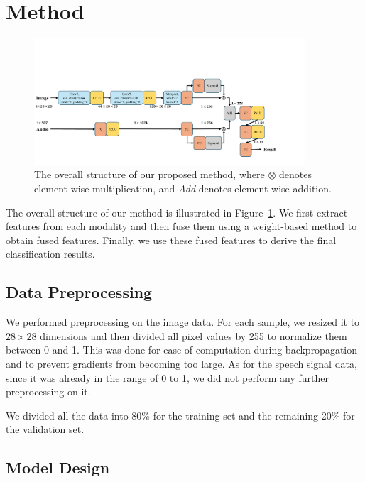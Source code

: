 \documentclass{article}
\begin{document}
\section{Method}

\begin{figure}[!t]
	\begin{center}

		\includegraphics[width=0.90\textwidth]{overview.pdf}
	\end{center}
	\caption{The overall structure of our proposed method, where $\otimes$ denotes element-wise multiplication, and \textit{Add} denotes element-wise addition.} 
	\label{fig:overview}
\end{figure}

The overall structure of our method is illustrated in Figure~\ref{fig:overview}. We first extract features from each modality and then fuse them using a weight-based method to obtain fused features. Finally, we use these fused features to derive the final classification results.

\subsection{Data Preprocessing}

We performed preprocessing on the image data. For each sample, we resized it to $28\times 28$ dimensions and then divided all pixel values by 255 to normalize them between 0 and 1. This was done for ease of computation during backpropagation and to prevent gradients from becoming too large. As for the speech signal data, since it was already in the range of 0 to 1, we did not perform any further preprocessing on it.

We divided all the data into 80\% for the training set and the remaining 20\% for the validation set.
\subsection{Model Design}
\end{document}

